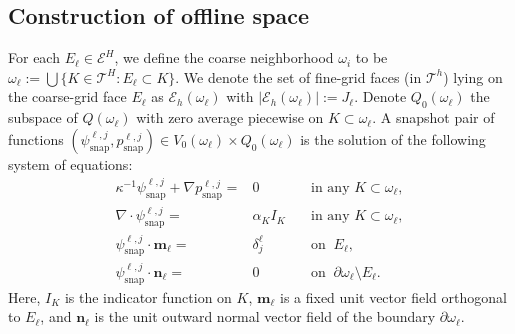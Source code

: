 \documentclass{article}[11pt]
\theoremstyle{definition}
\newcommand{\abs}[1]{\left |#1\right |}
\begin{document}
\subsection{Construction of offline space}
For each $E_\ell \in \mathcal{E}^H$, we define the coarse neighborhood $\omega_i$ to be $\omega_\ell := \bigcup \{ K \in \mathcal{T}^H: E_\ell \subset K\}$. We denote the set of fine-grid faces (in $\mathcal{T}^h$) lying on the coarse-grid face $E_\ell$ as $\mathcal{E}_h(\omega_\ell)$ with $\abs{\mathcal{E}_h (\omega_\ell) } := J_\ell$. 
Denote $Q_0(\omega_\ell)$ the subspace of $Q(\omega_\ell)$ with zero average piecewise on $K \subset \omega_\ell$.  
A snapshot pair of functions $(\psi_{\text{snap}}^{\ell,j}, p_{\text{snap}}^{\ell,j}) \in V_0(\omega_\ell) \times Q_0(\omega_\ell)$ is the solution of the following system of equations: 
\begin{equation}\label{eqn:def-snap}
\begin{aligned}
\kappa^{-1} \psi_{\text{snap}}^{\ell,j} + \nabla p_{\text{snap}}^{\ell,j}  = &0&\quad \text{in any } K\subset \omega_\ell,\\
\nabla \cdot \psi_{\text{snap}}^{\ell,j} = & \alpha_K I_K & \quad \text{in any } K \subset \omega_\ell,\\
\psi_{\text{snap}}^{\ell,j} \cdot \mathbf{m}_\ell = & \delta_j^\ell  & \quad \text{on }~ E_\ell, \\
\psi_{\text{snap}}^{\ell,j} \cdot \mathbf{n}_\ell = & 0 & \quad \text{on }~ \partial \omega_\ell \setminus E_\ell. 
\end{aligned}
\end{equation}
Here, $I_K$ is the indicator function on $K$, 
$\mathbf{m}_\ell$ is a fixed unit vector field orthogonal to $E_\ell$, and $\mathbf{n}_\ell$ is the unit outward normal vector field of the boundary $\partial \omega_\ell$. 
\end{document}
